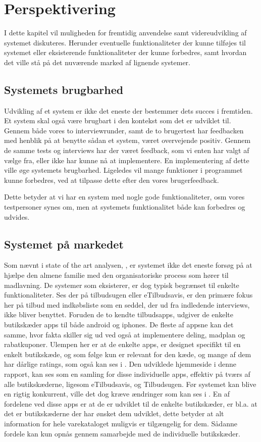 \chapter{Perspektivering}
I dette kapitel vil muligheden for fremtidig anvendelse samt videreudvikling af systemet diskuteres.
Herunder eventuelle funktionaliteter der kunne tilføjes til systemet eller eksisterende funktionaliteter der kunne forbedres, samt hvordan det ville stå på det nuværende marked af lignende systemer.

\section{Systemets brugbarhed}
Udvikling af et system er ikke det eneste der bestemmer dets succes i fremtiden.
Et system skal også være brugbart i den kontekst som det er udviklet til.
Gennem både vores to interviewrunder, samt de to brugertest har feedbacken med henblik på at benytte sådan et system, været overvejende positiv.
Gennem de samme tests og interviews har der været feedback, som vi enten har valgt af vælge fra, eller ikke har kunne nå at implementere.
En implementering af dette ville øge systemets brugbarhed.
Ligeledes vil mange funktioner i programmet kunne forbedres, ved at tilpasse dette efter den vores brugerfeedback. 

Dette betyder at vi har en system med nogle gode funktionaliteter, osm vores testpersoner synes om, men at systemets funktionalitet både kan forbedres og udvides.

\section{Systemet på markedet}
Som nævnt i state of the art analysen, , er systemet ikke det eneste forsøg på at hjælpe den almene familie med den organisatoriske process som hører til madlavning.
De systemer som eksisterer, er dog typisk begrænset til enkelte funktionaliteter.
Ses der på tilbudsugen eller eTilbudsavis, er den primære fokus her på tilbud med indkøbsliste som en seddel, der ud fra indledende interviews, ikke bliver benyttet.
Foruden de to kendte tilbudsapps, udgiver de enkelte butikskæder apps til både android og iphones.
De fleste af appsne kan det samme, hvor fakta skiller sig ud ved også at implementere deling, madplan og rabatkuponer.
Ulempen her er at de enkelte apps, er designet specifikt til en enkelt butikskæde, og som følge kun er relevant for den kæde, og mange af dem har dårlige ratings, som også kan ses i .
Den udviklede hjemmeside i denne rapport, kan ses som en samling for disse individuelle apps, effektiv på tværs af alle butikskæderne, ligesom eTilbudsavis, og Tilbudsugen.
Før systemet kan blive en rigtig konkurrent, ville det dog kræve ændringer som kan ses i .
En af fordelene ved disse apps er at de er udviklet til de enkelte butikskæder, er bl.a. at det er butikskæderne der har ønsket dem udviklet, dette betyder at alt information for hele varekataloget muligvis er tilgængelig for dem.
Sådanne fordele kan kun opnås gennem samarbejde med de individuelle butikskæder.

